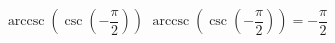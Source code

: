  {$\operatorname{arccsc}\left(\csc\left(-\dfrac{\pi}{2} \right) \right)$ }
{ $\operatorname{arccsc}\left(\csc\left(-\dfrac{\pi}{2} \right) \right) = -\dfrac{\pi}{2}$ }
